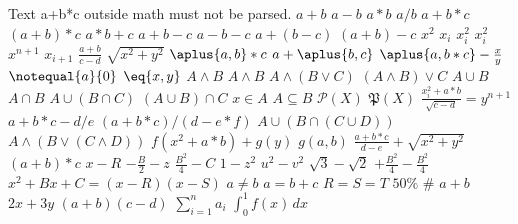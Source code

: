 \documentclass{article}
\begin{document}
Text a+b*c outside math must not be parsed.
$a+b$
$a-b$
$a*b$
$a/b$
$a+b*c$
$(a+b)*c$
$a*b+c$
$a+b-c$
$a-b-c$
$a+(b-c)$
$(a+b)-c$
$x^2$
$x_i$
$x_i^2$
$x^2_i$
$x^{n+1}$
$x_{i+1}$
$\frac{a+b}{c-d}$
$\sqrt{x^2+y^2}$
$\aplus{a,b}*c$
$a+\aplus{b,c}$
$\aplus{a,b*c}-\frac{x}{y}$
$\notequal{a}{0}$
$\eq{x,y}$
$A\wedge B$
$A\land B$
$A\wedge(B\vee C)$
$(A\wedge B)\vee C$
$A\cup B$
$A\cap B$
$A\cup(B\cap C)$
$(A\cup B)\cap C$
$x\in A$
$A\subseteq B$
$\mathcal{P}(X)$
$\mathfrak{P}(X)$
$\frac{x_i^2+a*b}{\sqrt{c-d}} = y^{n+1}$
$a+b*c-d/e$
$(a+b*c)/(d-e*f)$
$A\cup(B\cap(C\cup D))$
$A\wedge(B\vee(C\wedge D))$
$f(x^2+a*b)+g(y)$
$g(a,b)$
$\frac{a+b*c}{d-e} + \sqrt{x^2+y^2}$
$\left(a+b\right)*c$
$x-R$
$-\frac{B}{2} - z$
$\frac{B^2}{4} - C$
$1 - z^2$
$u^2 - v^2$
$\sqrt{3} - \sqrt{2}$
$+\frac{B^2}{4} - \frac{B^2}{4}$
$x^2 + Bx + C = (x-R)(x-S)$
$a \neq b$
$a = b+c$
$R=S=T$
$50\%$
$\#$
$a+b$ %
$2x + 3y$
$(a+b)(c-d)$
$\sum_{i=1}^{n} a_i$
$\int_0^1 f(x)\,dx$
\end{document}
